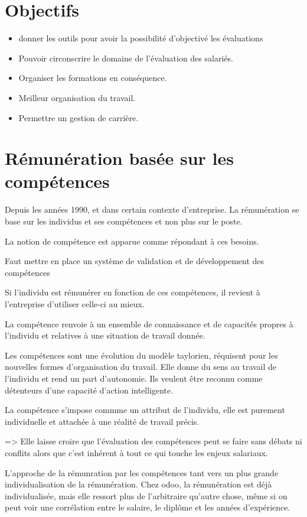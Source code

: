 \section{Objectifs}
\begin{itemize}
    \item donner les outils pour avoir la possibilité d'objectivé les évaluations
    \item Pouvoir circonscrire le domaine de l'évaluation des salariés. 
    \item Organiser les formations en conséquence. 
    \item Meilleur organisation du travail. 
    \item Permettre un gestion de carrière. 
\end{itemize}

\section{Rémunération basée sur les compétences} \cite{gestionressourceshumaine2007}
Depuis les années 1990, et dans certain contexte d'entreprise. La rémunération se base sur les individus et ses compétences et non plus sur le poste. 

La notion de compétence est apparue comme répondant à ces besoins. 

Faut mettre en place un système de validation et de développement des compétences

Si l'individu est rémunérer en fonction de ces compétences, il revient à l'entreprise d'utiliser celle-ci au mieux. 

La compétence renvoie à un ensemble de connaissance et de capacités propres à l'individu et relatives à une situation de travail donnée. 

Les compétences sont une évolution du modèle taylorien, réquisent pour les nouvelles formes d'organisation du travail. Elle donne du sens au travail de l'individu et rend un part d'autonomie. Ils veulent être reconnu comme détenteurs d'une capacité d'action intelligente. 

La compétence s'impose commme un attribut de l'individu, elle est purement individuelle et attachée à une réalité de travail précis. 

=> Elle laisse croire que l'évaluation des compétences peut se faire sans débats ni conflits alors que c'est inhérent à tout ce qui touche les enjeux salariaux. 

L'approche de la rémunration par les compétences tant vers un plus grande individualisation de la rémunération.
Chez odoo, la rémunération est déjà individualisée, mais elle ressort plus de l'arbitraire qu'autre chose, même si on peut voir une corrélation entre le salaire, le diplôme et les années d'expérience. 

